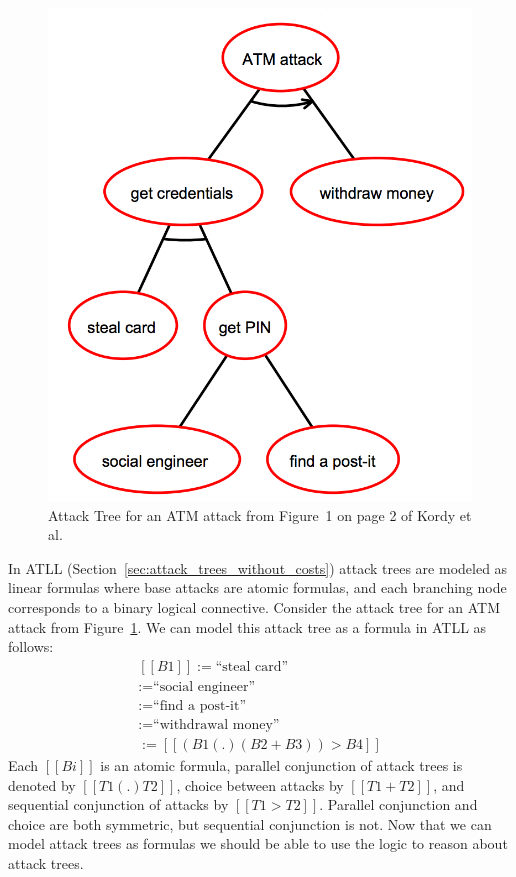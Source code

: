 \begin{figure}
  \vspace{-30px}
  \begin{center}
    \includegraphics[scale=0.225]{ATM-Tree1}
  \end{center}  
  \label{fig:atm-tree1}
  \caption{Attack Tree for an ATM attack from Figure~1 on page 2 of Kordy et al.~\cite{Kordy2017}}
  \vspace{-55px}
\end{figure}
In ATLL (Section~\ref{sec:attack_trees_without_costs}) attack trees
are modeled as linear formulas where base attacks are atomic formulas,
and each branching node corresponds to a binary logical connective.
Consider the attack tree for an ATM attack from
Figure~\ref{fig:atm-tree1}.  We can model this attack tree as a
formula in ATLL as follows:
\[
\begin{array}{lll}
  [[B1]] := \text{``steal card''}\\
  [[B2]] := \text{``social engineer''}\\
  [[B3]] := \text{``find a post-it''}\\
  [[B4]] := \text{``withdrawal money''}\\
  [[T1]] := [[(B1 (.) (B2 + B3)) > B4]]
\end{array}
\]
Each $[[Bi]]$ is an atomic formula, parallel conjunction of attack
trees is denoted by $[[T1 (.) T2]]$, choice between attacks by $[[T1 +
    T2]]$, and sequential conjunction of attacks by $[[T1 > T2]]$.
Parallel conjunction and choice are both symmetric, but sequential
conjunction is not.  Now that we can model attack trees as formulas we
should be able to use the logic to reason about attack trees.

